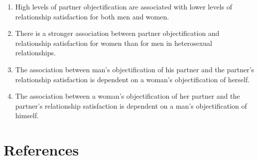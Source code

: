 \documentclass[
  english,
  man]{apa6}
\begin{document}
\begin{enumerate}
\def\labelenumi{\arabic{enumi}.}
\item
  High levels of partner objectification are associated with lower levels of relationship satisfaction for both men and women.
\item
  There is a stronger association between partner objectification and relationship satisfaction for women than for men in heterosexual relationships.
\item
  The association between man's objectification of his partner and the partner's relationship satisfaction is dependent on a woman's objectification of herself.
\item
  The association between a woman's objectification of her partner and the partner's relationship satisfaction is dependent on a man's objectification of himself.
\end{enumerate}

\newpage

\hypertarget{references}{%
\section{References}\label{references}}

\begingroup
\setlength{\parindent}{-0.5in}
\setlength{\leftskip}{0.5in}
\end{document}
